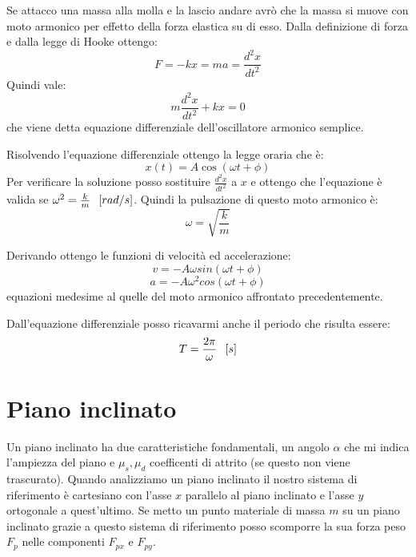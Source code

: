 \documentclass[class=book, crop=false, oneside, 12pt]{standalone}
\begin{document}
Se attacco una massa alla molla e la lascio andare avrò che la massa si muove con moto armonico per effetto della forza elastica su di esso.
Dalla definizione di forza e dalla legge di Hooke ottengo:
\begin{equation*}
    F = -kx = m a = \frac{d^2 x}{dt^2}
\end{equation*}
Quindi vale:
\begin{equation}
    m \frac{d^2 x}{dt^2} + k x = 0  
\end{equation}
che viene detta equazione differenziale dell'oscillatore armonico semplice. 

Risolvendo l'equazione differenziale ottengo la legge oraria che è:
\begin{equation}
    x(t) = A \cos (\omega t + \phi)
\end{equation}
Per verificare la soluzione posso sostituire \(\frac{d^2x}{dt^2}\) a \(x\) e ottengo che l'equazione è valida se \(\omega^2 = \frac{k}{m} \hspace{0.2cm} \left[rad/s\right]\).
Quindi la pulsazione di questo moto armonico è:
\begin{equation}
    \omega = \sqrt{\frac{k}{m}}
\end{equation}

Derivando ottengo le funzioni di velocità ed accelerazione:
\begin{equation*}
    v = -A \omega sin (\omega t + \phi)
\end{equation*}
\begin{equation*}
    a = - A \omega^2 cos (\omega t + \phi)
\end{equation*}
equazioni medesime al quelle del moto armonico affrontato precedentemente.

Dall'equazione differenziale posso ricavarmi anche il periodo che risulta essere:
\begin{equation*}
    T = \frac{2 \pi}{\omega} \hspace{0.2cm} \left[s\right]
\end{equation*}

\section{Piano inclinato}

Un piano inclinato ha due caratteristiche fondamentali, un angolo \(\alpha\) che mi indica l'ampiezza del piano e \(\mu_s, \mu_d\) coefficenti di attrito (se questo non viene trascurato).
Quando analizziamo un piano inclinato il nostro sistema di riferimento è cartesiano con l'asse \(x\) parallelo al piano inclinato e l'asse \(y\) ortogonale a quest'ultimo.
Se metto un punto materiale di massa \(m\) su un piano inclinato grazie a questo sistema di riferimento posso scomporre la sua forza peso \(F_p\) nelle componenti \(F_{px}\) e \(F_{py}\).
\end{document}
